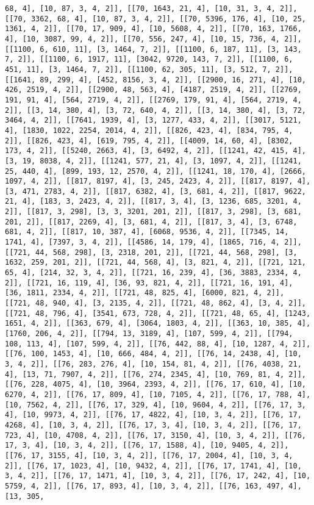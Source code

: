 \documentclass[12pt,fleqn]{article}\usepackage{../../common}
\begin{document}
\begin{verbatim}
68, 4], [10, 87, 3, 4, 2]], [[70, 1643, 21, 4], [10, 31, 3, 4, 2]], [[70, 3362, 68, 4], [10, 87, 3, 4, 2]], [[70, 5396, 176, 4], [10, 25, 1361, 4, 2]], [[70, 17, 909, 4], [10, 5608, 4, 2]], [[70, 163, 1766, 4], [10, 3087, 99, 4, 2]], [[70, 556, 247, 4], [10, 15, 736, 4, 2]], [[1100, 6, 610, 11], [3, 1464, 7, 2]], [[1100, 6, 187, 11], [3, 143, 7, 2]], [[1100, 6, 1917, 11], [3042, 9720, 143, 7, 2]], [[1100, 6, 451, 11], [3, 1464, 7, 2]], [[1100, 62, 305, 11], [3, 512, 7, 2]], [[1641, 89, 299, 4], [452, 8156, 3, 4, 2]], [[2900, 16, 271, 4], [10, 426, 2519, 4, 2]], [[2900, 48, 563, 4], [4187, 2519, 4, 2]], [[2769, 191, 91, 4], [564, 2719, 4, 2]], [[2769, 179, 91, 4], [564, 2719, 4, 2]], [[3, 14, 380, 4], [3, 72, 640, 4, 2]], [[3, 14, 380, 4], [3, 72, 3464, 4, 2]], [[7641, 1939, 4], [3, 1277, 433, 4, 2]], [[3017, 5121, 4], [1830, 1022, 2254, 2014, 4, 2]], [[826, 423, 4], [834, 795, 4, 2]], [[826, 423, 4], [619, 795, 4, 2]], [[4009, 14, 60, 4], [8302, 173, 4, 2]], [[5240, 2663, 4], [3, 6492, 4, 2]], [[1241, 42, 415, 4], [3, 19, 8038, 4, 2]], [[1241, 577, 21, 4], [3, 1097, 4, 2]], [[1241, 25, 440, 4], [899, 193, 12, 2570, 4, 2]], [[1241, 18, 170, 4], [2666, 1097, 4, 2]], [[817, 8197, 4], [3, 245, 2423, 4, 2]], [[817, 8197, 4], [3, 471, 2783, 4, 2]], [[817, 6382, 4], [3, 681, 4, 2]], [[817, 9622, 21, 4], [183, 3, 2423, 4, 2]], [[817, 3, 4], [3, 1236, 685, 3201, 4, 2]], [[817, 3, 298], [3, 3, 3201, 201, 2]], [[817, 3, 298], [3, 681, 201, 2]], [[817, 2269, 4], [3, 681, 4, 2]], [[817, 3, 4], [3, 6748, 681, 4, 2]], [[817, 10, 387, 4], [6068, 9536, 4, 2]], [[7345, 14, 1741, 4], [7397, 3, 4, 2]], [[4586, 14, 179, 4], [1865, 716, 4, 2]], [[721, 44, 568, 298], [3, 2318, 201, 2]], [[721, 44, 568, 298], [3, 1632, 259, 201, 2]], [[721, 44, 568, 4], [3, 821, 4, 2]], [[721, 121, 65, 4], [214, 32, 3, 4, 2]], [[721, 16, 239, 4], [36, 3883, 2334, 4, 2]], [[721, 16, 119, 4], [36, 93, 821, 4, 2]], [[721, 16, 191, 4], [36, 1811, 2334, 4, 2]], [[721, 48, 825, 4], [6000, 821, 4, 2]], [[721, 48, 940, 4], [3, 2135, 4, 2]], [[721, 48, 862, 4], [3, 4, 2]], [[721, 48, 796, 4], [3541, 673, 728, 4, 2]], [[721, 48, 65, 4], [1243, 1651, 4, 2]], [[363, 679, 4], [3064, 1803, 4, 2]], [[363, 10, 385, 4], [1760, 206, 4, 2]], [[794, 13, 3189, 4], [107, 599, 4, 2]], [[794, 108, 113, 4], [107, 599, 4, 2]], [[76, 442, 88, 4], [10, 1287, 4, 2]], [[76, 100, 1453, 4], [10, 666, 484, 4, 2]], [[76, 14, 2438, 4], [10, 3, 4, 2]], [[76, 283, 276, 4], [10, 154, 81, 4, 2]], [[76, 4038, 21, 4], [13, 71, 7907, 4, 2]], [[76, 274, 2345, 4], [10, 769, 81, 4, 2]], [[76, 228, 4075, 4], [10, 3964, 2393, 4, 2]], [[76, 17, 610, 4], [10, 6270, 4, 2]], [[76, 17, 809, 4], [10, 7105, 4, 2]], [[76, 17, 788, 4], [10, 7562, 4, 2]], [[76, 17, 329, 4], [10, 9604, 4, 2]], [[76, 17, 3, 4], [10, 9973, 4, 2]], [[76, 17, 4822, 4], [10, 3, 4, 2]], [[76, 17, 4268, 4], [10, 3, 4, 2]], [[76, 17, 3, 4], [10, 3, 4, 2]], [[76, 17, 723, 4], [10, 4708, 4, 2]], [[76, 17, 3150, 4], [10, 3, 4, 2]], [[76, 17, 3, 4], [10, 3, 4, 2]], [[76, 17, 1588, 4], [10, 9405, 4, 2]], [[76, 17, 3155, 4], [10, 3, 4, 2]], [[76, 17, 2004, 4], [10, 3, 4, 2]], [[76, 17, 1023, 4], [10, 9432, 4, 2]], [[76, 17, 1741, 4], [10, 3, 4, 2]], [[76, 17, 1471, 4], [10, 3, 4, 2]], [[76, 17, 242, 4], [10, 5759, 4, 2]], [[76, 17, 893, 4], [10, 3, 4, 2]], [[76, 163, 497, 4], [13, 305, 
\end{verbatim}
\end{document}

